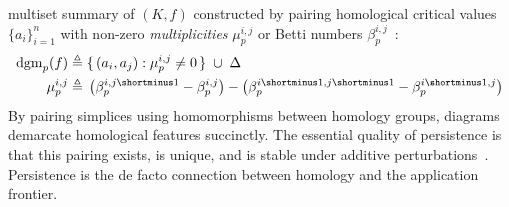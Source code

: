 \documentclass[10pt twocolumn]{article}
\numberwithin{equation}{section}
\newcommand{\+}{%
	\raisebox{0.18ex}{\scaleobj{0.55}{+}}
}
\theoremstyle{definition}
\theoremstyle{definition}
\begin{document}
\begin{multicols}{2}
multiset summary of $(K,f)$ constructed by pairing homological critical values $\{ a_i \}_{i=1}^n$ with non-zero \emph{multiplicities} $\mu_p^{i,j}$ or Betti numbers $\beta_p^{i,j}$~\cite{cohen2005stability}: 
\begin{align*}
	\mathrm{dgm}_p(f) \triangleq & \; \{ \, (a_i, a_j) :  \mu_p^{i,j} \neq 0 \, \} \; \cup \; \Delta \\
\mu_p^{i,j} \triangleq & \; \left(\beta_p^{i,j\shortminus1} - \beta_p^{i,j} \right) - \left(\beta_p^{i\shortminus1,j\shortminus1} - \beta_p^{i\shortminus1,j} \right)
\end{align*}\label{eq:dgm}
\noindent
By pairing simplices using homomorphisms between homology groups, diagrams demarcate homological features succinctly.
The essential quality of persistence is that this pairing exists, is unique, and is stable under additive perturbations~\cite{cohen2005stability}.
Persistence is the de facto connection between homology and the application frontier.


\end{multicols}
\end{document}
